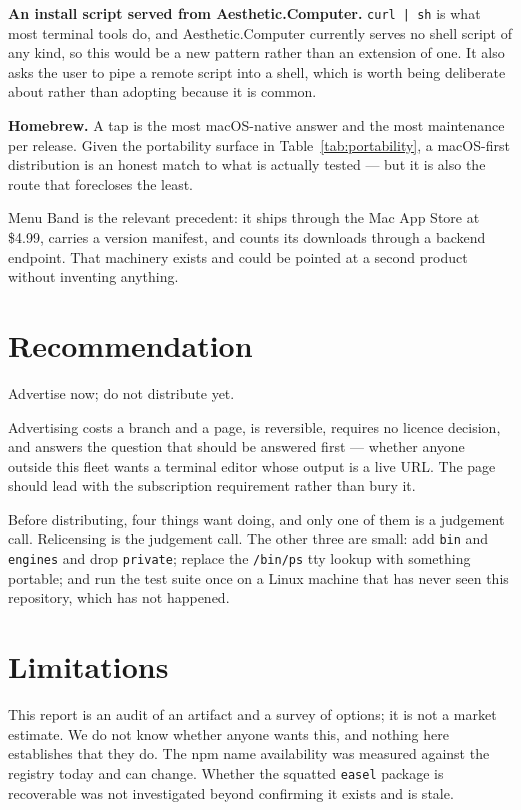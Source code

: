 \documentclass[10pt,letterpaper,twocolumn]{article}
\newcommand{\acdot}{{\color{acpink}.}}
\newcommand{\ac}{Aesthetic{\acdot}Computer}
\newcommand{\code}[1]{\texttt{#1}}
\begin{document}
\textbf{An install script served from \ac{}.} \code{curl | sh} is what most
terminal tools do, and \ac{} currently serves no shell script of any kind, so
this would be a new pattern rather than an extension of one. It also asks the
user to pipe a remote script into a shell, which is worth being deliberate
about rather than adopting because it is common.

\textbf{Homebrew.} A tap is the most macOS-native answer and the most
maintenance per release. Given the portability surface in
Table~\ref{tab:portability}, a macOS-first distribution is an honest match to
what is actually tested --- but it is also the route that forecloses the least.

Menu Band is the relevant precedent: it ships through the Mac App Store at
\$4.99, carries a version manifest, and counts its downloads through a backend
endpoint. That machinery exists and could be pointed at a second product
without inventing anything.

\section{Recommendation}

Advertise now; do not distribute yet.

Advertising costs a branch and a page, is reversible, requires no licence
decision, and answers the question that should be answered first --- whether
anyone outside this fleet wants a terminal editor whose output is a live URL.
The page should lead with the subscription requirement rather than bury it.

Before distributing, four things want doing, and only one of them is a judgement
call. Relicensing is the judgement call. The other three are small: add
\code{bin} and \code{engines} and drop \code{private}; replace the \code{/bin/ps}
tty lookup with something portable; and run the test suite once on a Linux
machine that has never seen this repository, which has not happened.

\section{Limitations}

This report is an audit of an artifact and a survey of options; it is not a
market estimate. We do not know whether anyone wants this, and nothing here
establishes that they do. The npm name availability was measured against the
registry today and can change. Whether the squatted \code{easel} package is
recoverable was not investigated beyond confirming it exists and is stale.
\end{document}
